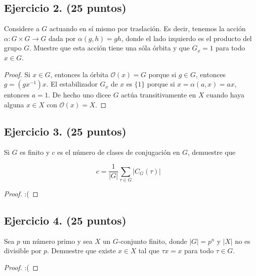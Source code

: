 \documentclass[letterpaper]{article}
\begin{document}
\subsection*{Ejercicio 2. (25 puntos)}
Considere a $G$ actuando en sí mismo por traslación. Es decir, tenemos la acción $\alpha : G \times G \to G$
dada por $\alpha(g, h) = gh$, donde el lado izquierdo es el producto del grupo $G$. Muestre que esta acción
tiene una sóla órbita y que $G_x = 1$ para todo $x \in G$.

\begin{proof}
Si $x \in G$, entonces la órbita $\mathcal{O}(x) = G$ porque si $g \in G$, entonces $g = (gx^{-1})x$. El
estabilizador $G_x$ de $x$ es $\{ 1 \}$ porque si $x = \alpha(a, x) = ax$, entonces $a = 1$. De hecho uno dicee
$G$ actúa transitivamente en $X$ cuando haya alguna $x \in X$ con $\mathcal{O}(x) = X$.
\end{proof}


\subsection*{Ejercicio 3. (25 puntos)}
Si $G$ es finito y $c$ es el número de clases de conjugación en $G$, demuestre que

$$ c = \frac{1}{|G|} \sum_{\tau \in G} |C_{G} (\tau)| $$

\begin{proof}
:(
\end{proof}


\subsection*{Ejercicio 4. (25 puntos)}
Sea $p$ un número primo y sea $X$ un $G$-conjunto finito, donde $|G| = p^n$ y $|X|$ no es divisible por $p$.
Demuestre que existe $x \in X$ tal que $\tau x = x$ para todo $\tau \in G$.

\begin{proof}
:(
\end{proof}




\end{document}
